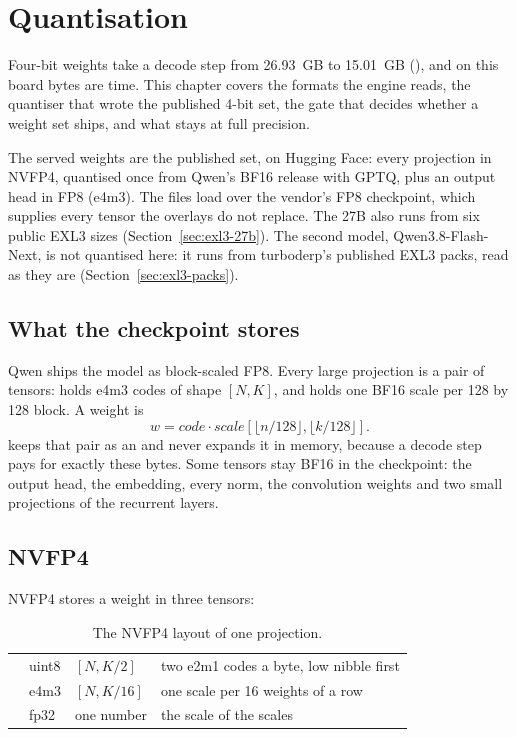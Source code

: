 \chapter{Quantisation}\label{ch:quantisation}

Four-bit weights take a decode step from 26.93~GB to 15.01~GB (\arith), and on this board bytes are time. This chapter covers the formats the engine reads, the quantiser that wrote the published 4-bit set, the gate that decides whether a weight set ships, and what stays at full precision.

The served weights are the published set,  on Hugging Face: every projection in NVFP4, quantised once from Qwen's BF16 release with GPTQ, plus an output head in FP8 (e4m3). The files load over the vendor's FP8 checkpoint, which supplies every tensor the overlays do not replace. The 27B also runs from six public EXL3 sizes (Section~\ref{sec:exl3-27b}). The second model, Qwen3.8-Flash-Next, is not quantised here: it runs from turboderp's published EXL3 packs, read as they are (Section~\ref{sec:exl3-packs}).

\section{What the checkpoint stores}

Qwen ships the model as block-scaled FP8. Every large projection is a pair of tensors:  holds e4m3 codes of shape $[N, K]$, and  holds one BF16 scale per 128 by 128 block. A weight is
\[
w = \textit{code} \cdot \textit{scale}[\lfloor n/128 \rfloor, \lfloor k/128 \rfloor].
\]
 keeps that pair as an  and never expands it in memory, because a decode step pays for exactly these bytes. Some tensors stay BF16 in the checkpoint: the output head, the embedding, every norm, the convolution weights and two small projections of the recurrent layers.

\section{NVFP4}

NVFP4 stores a weight in three tensors:

\begin{table}[htbp]
\centering\small
\caption{The NVFP4 layout of one projection.}\label{tab:nvfp4-layout}
\begin{tabularx}{\linewidth}{@{}L{.22\linewidth}L{.1\linewidth}L{.12\linewidth}Y@{}}
\toprule
{} &  &  &  \\
\midrule
{} & uint8 & $[N, K/2]$ & two e2m1 codes a byte, low nibble first \\
 & e4m3 & $[N, K/16]$ & one scale per 16 weights of a row \\
 & fp32 & one number & the scale of the scales \\
\bottomrule
\end{tabularx}
\end{table}

